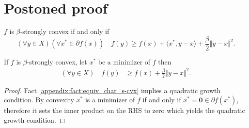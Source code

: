 \documentclass[12pt]{article}
\begin{document}
        
        



\section{Postoned proof}
    \begin{fact}
    \label{appendix:fact:equiv_char_s-cvx}
        $f$ is $\beta$-strongly convex if and only if
        $$
            (\forall y\in X)(\forall x^* \in \partial f(x))
            \quad f(y) \ge f(x) + \langle x^*, y - x\rangle +
            \frac{\beta}{2}\Vert y - x\Vert^2
            .
        $$
    \end{fact}

    \begin{theorem}\label{appendix:thm:q_growth}
        If $f$ is $\beta$-strongly convex, let $x^*$ be a minimizer of $f$ then 
        \begin{align*}
            (\forall y \in X) \quad 
            f(y) &\ge 
            f(x) + \frac{\beta}{2}\Vert y - x\Vert^2. 
        \end{align*}
    \end{theorem}
    \begin{proof}
        Fact \ref*{appendix:fact:equiv_char_s-cvx} 
        implies a quadratic growth condition. 
        By convexity $x^*$ is a minimizer of $f$ if and only if $x^*= \mathbf 0 \in \partial f(x^*)$, therefore it sets the inner product on the RHS to zero which yields the quadratic growth condition. 
    \end{proof}
\end{document}
